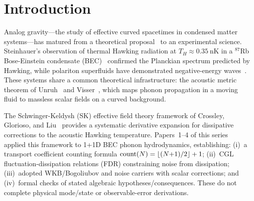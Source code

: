 \documentclass[aps,prd,twocolumn,showpacs,superscriptaddress,nofootinbib]{revtex4-2}
\begin{document}
\begin{abstract}
For the stated charged conformal assumptions, the first-order roster
contains 2~coefficients ($\eta$, $\sigma_Q$), matching the numerical
1+1D BEC count. The independent charged 2+1D second-order basis,
integration-by-parts quotient and applicable KMS/positivity constraints
remain to be constructed; the earlier approximate nine count is unestablished. The giant Wiedemann-Franz violation
($L/L_0 > 200\times$, Majumdar~\textit{et~al.}, 2025) arises from two-channel
transport: charge ($\sigma_Q$) and heat ($\kappa_{\rm th} \propto s^2/\sigma_Q$),
consistent with the SK-EFT two-channel structure. The adopted formulas
have scalar and algebraic Lean~4 checks (58~theorems, zero sorry), with
numerical illustrations from a Python computation pipeline.
No test cardinality or fresh test-run receipt is asserted here.
These checks do not derive the physical electrical response or establish
microscopic route equivalence or calibrated detection sensitivity.
\end{abstract}

\maketitle

\section{Introduction}
\label{sec:intro}

Analog gravity---the study of effective curved spacetimes in condensed matter
systems---has matured from a theoretical proposal~\cite{Unruh1981} to an
experimental science. Steinhauer's observation of thermal Hawking radiation
at $T_H \approx \SI{0.35}{\nano\kelvin}$ in a $^{87}$Rb Bose-Einstein
condensate (BEC)~\cite{deNova2019} confirmed the Planckian spectrum predicted
by Hawking, while polariton superfluids have demonstrated negative-energy
waves~\cite{Falque2025}. These systems share a common theoretical
infrastructure: the acoustic metric theorem of Unruh~\cite{Unruh1981} and
Visser~\cite{Visser1998}, which maps phonon propagation in a moving fluid to
massless scalar fields on a curved background.

The Schwinger-Keldysh (SK) effective field theory framework of
Crossley, Glorioso, and Liu~\cite{CGL2017a,CGL2017b} provides a systematic
derivative expansion for dissipative corrections to the acoustic Hawking
temperature. Papers~1--4 of this series applied this framework to 1+1D BEC
phonon hydrodynamics, establishing: (i)~a transport coefficient counting
formula ${\rm count}(N) = \lfloor(N{+}1)/2\rfloor + 1$; (ii)~CGL
fluctuation-dissipation relations (FDR) constraining noise from dissipation;
(iii)~adopted WKB/Bogoliubov and noise carriers with scalar corrections;
and (iv)~formal checks of stated algebraic hypotheses/consequences. These
do not complete physical mode/state or observable-error derivations.
\end{document}
